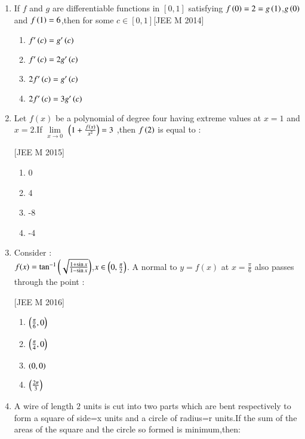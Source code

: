 \documentclass[journal,12pt,twocolumn]{IEEEtran}
\theoremstyle{remark}
\begin{document}
\begin{enumerate}
\begin{enumerate}
\end{enumerate}

\item If $f$ and $g$ are differentiable functions in ${[0,1]}$ satisfying $f\left(0\right)=2=g\left(1\right)$,$g\left(0\right)$ and $f\left(1\right)=6$,then for some $c\in {[0,1]}$\hfill[JEE M 2014]
\begin{enumerate}
    \item  $f'\left(c\right)=g'\left(c\right)$\\
    \item  $f'\left(c\right)=2g'\left(c\right)$\\
    \item  $2f'\left(c\right)=g'\left(c\right)$\\
    \item  $2f'\left(c\right)=3g'\left(c\right)$\\
\end{enumerate}
\item Let $f(x)$ be a polynomial of degree four having extreme values at $x=1$ and $x=2$.If $\lim\limits_{x\to 0}$ $\left(1+\frac{f(x)}{x^{2}}\right)=3$ ,then $f\left(2\right)$ is equal to :

    \hfill[JEE M 2015]\\
\begin{enumerate}
    \item  0\\
    \item  4\\
    \item -8\\
    \item -4\\
\end{enumerate}    
\item Consider $:$\\
     $f(x)=\tan^{-1}\left( \sqrt{\frac{1+\sin{x}}{1-\sin{x}} }\right)$,$x \in \left(0,\frac{\pi}{2}\right)$.
A normal to $y=f(x)$ at $x=\frac{\pi}{6}$ also passes through the point :

\hfill[JEE M 2016]\\
\begin{enumerate}
    \item  $\left(\frac{\pi}{6},0\right)$\\
    \item  $\left(\frac{\pi}{4},0\right)$\\
    \item  $\left(0,0\right)$\\
    \item  $\left(\frac{2\pi}{3}\right)$\\
\end{enumerate}
\item A wire of length $2$ units is cut into two parts which are bent respectively to form a square of side=x units and a circle of radius=r units.If the sum of the areas of the square and the circle so formed is minimum,then:


\end{enumerate}
\end{document}
